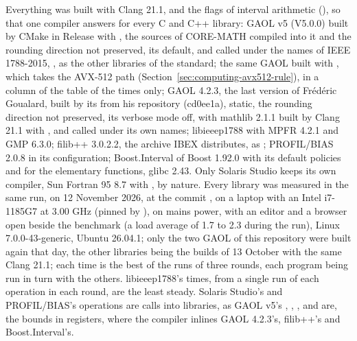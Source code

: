 Everything was built with Clang 21.1,  and
the flags of interval arithmetic (), so that one
compiler answers for every C and C++ library: GAOL v5 (V5.0.0) built by
CMake in Release with , the sources of CORE-MATH compiled
into it and the rounding direction not preserved, its default, and called
under the names of IEEE 1788-2015, , as the other
libraries of the standard; the same GAOL built with
, which takes the AVX-512 path
(Section~\ref{sec:computing-avx512-rule}), in a column of the table of the
times only; GAOL 4.2.3, the last version of Fr\'ed\'eric Goualard, built
by its  from his repository (cd0ee1a), static, the rounding
direction not preserved, its verbose mode off, with mathlib 2.1.1 built by
Clang 21.1 with , and called under its
own names; libieeep1788 with MPFR 4.2.1 and GMP 6.3.0; filib++ 3.0.2.2, the
archive IBEX distributes, as
;
PROFIL/BIAS 2.0.8 in its  configuration;
Boost.Interval of Boost 1.92.0 with its default policies and
 for the elementary functions, glibc 2.43. Only
Solaris Studio keeps its own compiler, Sun Fortran 95 8.7 with
, by nature. Every library was measured in the same run, on 12 November 2026, at the commit , on a laptop with an Intel i7-1185G7 at 3.00 GHz (pinned by ), on mains power, with an editor and a browser open beside the benchmark (a load average of 1.7 to 2.3 during the run), Linux 7.0.0-43-generic, Ubuntu 26.04.1; only the two GAOL of this repository were built again that day, the other libraries being the builds of 13 October with the same Clang 21.1; each time is
the best of the runs of three rounds, each program being run in turn with
the others. libieeep1788's times, from a single run of each operation in
each round, are the least steady. Solaris Studio's and PROFIL/BIAS's
operations are calls into libraries, as GAOL v5's \code{+}, \code{-},
\code{*}, \code{/} and  are, the bounds in registers, where the
compiler inlines GAOL 4.2.3's, filib++'s and Boost.Interval's.

